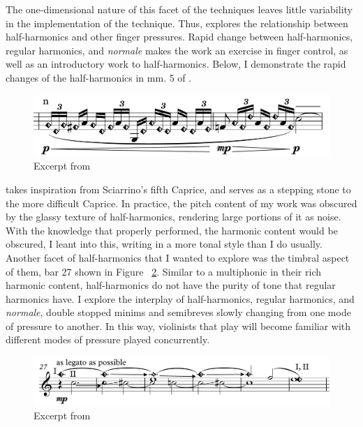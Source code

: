 The one-dimensional nature of this facet of the techniques leaves little variability in the implementation of the technique. 
Thus, \violinPiece explores the relationship between half-harmonics and other finger pressures. 
Rapid change between half-harmonics, regular harmonics, and \emph{normale} makes the work an exercise in finger control, as well as an introductory work to half-harmonics.
Below, I demonstrate the rapid changes of the half-harmonics in mm. 5 of \violinPiece.

\begin{figure}
    \includegraphics[width=\linewidth]{./resources/violinHalfHarmonicsExcerpt5.pdf}
    \caption{Excerpt from \violinPiece}
  \label{fig:Excerpt from what are you doing with the humans, mm. 5}
  \end{figure}

\violinPiece takes inspiration from Sciarrino's fifth Caprice, and serves as a stepping stone to the more difficult Caprice.\autocite[]{sciarrinoCapricciViolino1976} 
In practice, the pitch content of my work was obscured by the glassy texture of half-harmonics, rendering large portions of it as noise. 
With the knowledge that properly performed, the harmonic content would be obscured, I leant into this, writing in a more tonal style than I do usually.
Another facet of half-harmonics that I wanted to explore was the timbral aspect of them, bar 27 shown in Figure ~\ref{fig:violinHalfHarmonicsExcerpt27}.
Similar to a multiphonic in their rich harmonic content, half-harmonics do not have the purity of tone that regular harmonics have.
I explore the interplay of half-harmonics, regular harmonics, and \emph{normale}, double stopped minims and semibreves slowly changing from one mode of pressure to another.
In this way, violinists that play \violinPiece will become familiar with different modes of pressure played concurrently.

\begin{figure}
    \includegraphics[width=\linewidth]{./resources/violinHalfHarmonicsExcerpt27.pdf}
    \caption{Excerpt from \violinPiece} \label{fig:violinHalfHarmonicsExcerpt27}
  \end{figure}

